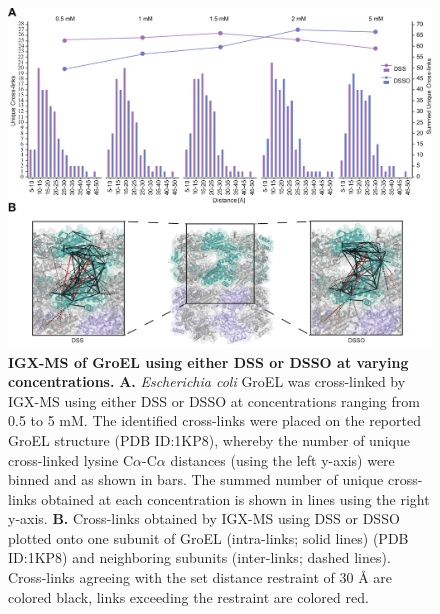\begin{figure}[htb]
    \center
    \includegraphics[]{Chapter.2/Figures/Figure2.png}
    \caption{\textbf{IGX-MS of GroEL using either DSS or DSSO at varying concentrations.} \textbf{A.} \emph{Escherichia coli} GroEL was cross-linked by IGX-MS using either DSS or DSSO at concentrations ranging from 0.5 to 5 mM. The identified cross-links were placed on the reported GroEL structure (PDB ID:1KP8), whereby the number of unique cross-linked lysine C$\alpha$-C$\alpha$ distances (using the left y-axis) were binned and as shown in bars. The summed number of unique cross-links obtained at each concentration is shown in lines using the right y-axis. \textbf{B.} Cross-links obtained by IGX-MS using DSS or DSSO plotted onto one subunit of GroEL (intra-links; solid lines) (PDB ID:1KP8) and neighboring subunits (inter-links; dashed lines). Cross-links agreeing with the set distance restraint of 30 Å are colored black, links exceeding the restraint are colored red.}
    \label{fig:ch2_fig2}
\end{figure}
